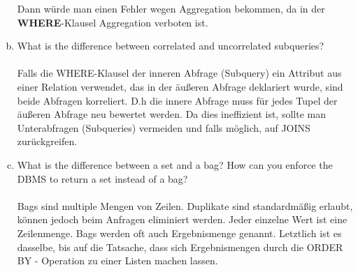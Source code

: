 \documentclass[11pt,a4paper,DIV=9]{scrartcl}
\begin{document}
\begin{enumerate}[a.]
Dann w\"urde man einen Fehler wegen Aggregation bekommen, da in der \textbf{WHERE}-Klausel Aggregation verboten ist. \\
\item What is the difference between correlated and uncorrelated subqueries? \hfill\\\\
Falls die WHERE-Klausel der inneren Abfrage (Subquery) ein Attribut aus einer Relation verwendet, das in der \"au{\ss}eren Abfrage deklariert wurde, sind beide Abfragen korreliert. D.h die innere Abfrage muss f\"ur jedes Tupel der \"au{\ss}eren Abfrage neu bewertet werden. Da dies ineffizient ist, sollte man Unterabfragen (Subqueries) vermeiden und falls m\"oglich, auf JOINS zur\"uckgreifen. \\
\item What is the difference between a set and a bag? How can you enforce the DBMS to return a set instead of a bag? \\\\
Bags sind multiple Mengen von Zeilen. Duplikate sind standardm\"a{\ss}ig erlaubt, k\"onnen jedoch beim Anfragen eliminiert werden. Jeder einzelne Wert ist eine Zeilenmenge. Bags werden oft auch Ergebnismenge genannt. Letztlich ist es dasselbe, bis auf die Tatsache, dass sich Ergebnismengen durch die ORDER BY - Operation zu einer Listen machen lassen.

 \end{enumerate}
\end{document}
